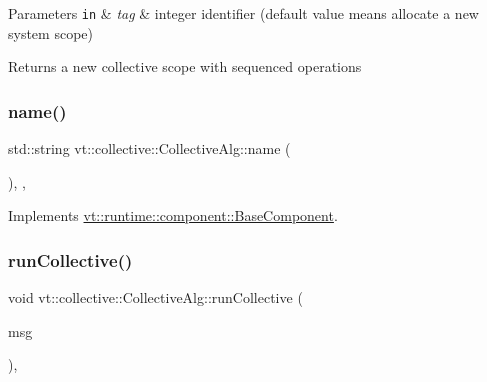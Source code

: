 \begin{DoxyParams}[1]{Parameters}
\mbox{\tt in}  & {\em tag} & integer identifier (default value means allocate a new system scope)\\
\hline
\end{DoxyParams}
\begin{DoxyReturn}{Returns}
a new collective scope with sequenced operations 
\end{DoxyReturn}
\mbox{\label{structvt_1_1collective_1_1_collective_alg_a81788afa34bc094c9f71fef8681aefb3}} 
\subsubsection{\texorpdfstring{name()}{name()}}
{\footnotesize\ttfamily std\+::string vt\+::collective\+::\+Collective\+Alg\+::name (\begin{DoxyParamCaption}{ }\end{DoxyParamCaption})\hspace{0.3cm}{\ttfamily [inline]}, {\ttfamily [override]}, {\ttfamily [virtual]}}



Implements \hyperlink{structvt_1_1runtime_1_1component_1_1_base_component_a7701485f3539f78d42e6bad47fc7eb78}{vt\+::runtime\+::component\+::\+Base\+Component}.

\mbox{\label{structvt_1_1collective_1_1_collective_alg_a9ed7397e91a18458c3a578be3605baa9}} 
\subsubsection{\texorpdfstring{run\+Collective()}{runCollective()}}
{\footnotesize\ttfamily void vt\+::collective\+::\+Collective\+Alg\+::run\+Collective (\begin{DoxyParamCaption}\item[{\hyperlink{structvt_1_1collective_1_1_collective_alg_1_1_collective_msg}{Collective\+Msg} $\ast$}]{msg }\end{DoxyParamCaption})\hspace{0.3cm}{\ttfamily [static]}, {\ttfamily [private]}}



